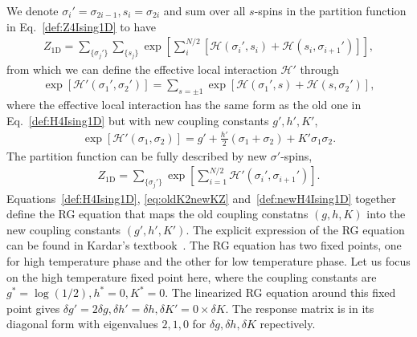 \documentclass[aps,prb,reprint,superscriptaddress]{revtex4-2}
\begin{document}
We denote $\sigma_i'=\sigma_{2i-1}, s_i = \sigma_{2i}$ and sum over all
$s$-spins in the partition function in Eq.~\eqref{def:Z4Ising1D} to have
%
\begin{align}\label{eq:oldK2newKZ}
    Z_{\text{1D}} = \sum_{\{\sigma_j'\}} \sum_{\{s_j \}}
    \exp{\left[ \sum_i^{N/2} \left[\mathscr{H}\left(\sigma_i',s_i\right)
    + \mathscr{H}\left(s_i,\sigma_{i+1}'\right)\right]\right]},
\end{align}
%
from which we can define the effective local interaction $\mathscr{H}'$
through
%
\begin{align}\label{eq:oldK2newK}
    \exp{\left[\mathscr{H}'\left(\sigma_1',\sigma_2'\right)\right]} =
    \sum_{s=\pm 1}\exp{\left[\mathscr{H}\left(\sigma_1',s\right) +
        \mathscr{H}\left(s,\sigma_2'\right)\right]},
\end{align}
%
where the effective local interaction has the same form as the old one
in Eq.~\eqref{def:H4Ising1D} but with new coupling constants $g',h',K'$,
%
\begin{align}\label{def:newH4Ising1D}
    \exp{\left[\mathscr{H}'\left(\sigma_1,\sigma_2\right)\right]} = g' +
    \frac{h'}{2}\left(\sigma_1 + \sigma_2\right) + K' \sigma_1 \sigma_2.
\end{align}
%
The partition function can be fully described by new $\sigma'$-spins,
%
\begin{align}\label{eq:Z2Ising1Dnew}
    Z_{\text{1D}} = \sum_{\{\sigma_j'\}}
    \exp{\left[\sum_{i=1}^{N/2}\mathscr{H}'\left(\sigma_i',\sigma_{i+1}'\right)\right]}.
\end{align}
%
Equations~\eqref{def:H4Ising1D}, \eqref{eq:oldK2newKZ}
and~\eqref{def:newH4Ising1D} together define the RG equation that maps
the old coupling constatns $(g,h,K)$ into the new coupling constants
$(g',h',K')$. The explicit expression of the RG equation can be found in
Kardar's textbook~\cite{kardar2007}. The RG equation has two fixed
points, one for high temperature phase and the other for low temperature
phase. Let us focus on the high temperature fixed point here, where the
coupling constants are $g^* = \log\left(1/2\right),h^*=0,K^*=0$. The
linearized RG equation around this fixed point gives $\delta g' =
2\delta g, \delta h' = \delta h, \delta K' = 0\times \delta K$. The
response matrix is in its diagonal form with eigenvalues $2,1,0$ for
$\delta g,\delta h,\delta K$ repectively.
%
\end{document}
